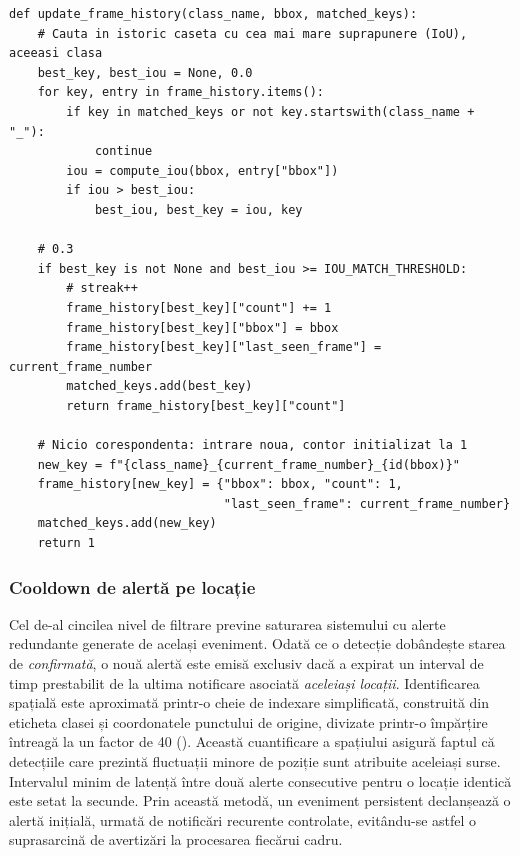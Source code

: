 \documentclass[../../main.tex]{subfiles}
\begin{document}
\begin{listing}[H]
\begin{verbatim}
def update_frame_history(class_name, bbox, matched_keys):
    # Cauta in istoric caseta cu cea mai mare suprapunere (IoU), aceeasi clasa
    best_key, best_iou = None, 0.0
    for key, entry in frame_history.items():
        if key in matched_keys or not key.startswith(class_name + "_"):
            continue
        iou = compute_iou(bbox, entry["bbox"])
        if iou > best_iou:
            best_iou, best_key = iou, key

    # 0.3
    if best_key is not None and best_iou >= IOU_MATCH_THRESHOLD:
        # streak++
        frame_history[best_key]["count"] += 1
        frame_history[best_key]["bbox"] = bbox
        frame_history[best_key]["last_seen_frame"] = current_frame_number
        matched_keys.add(best_key)
        return frame_history[best_key]["count"]

    # Nicio corespondenta: intrare noua, contor initializat la 1
    new_key = f"{class_name}_{current_frame_number}_{id(bbox)}"
    frame_history[new_key] = {"bbox": bbox, "count": 1,
                              "last_seen_frame": current_frame_number}
    matched_keys.add(new_key)
    return 1
\end{verbatim}
\caption{Corelarea temporală a detecțiilor prin IoU (\texttt{\_update\_frame\_history} din \texttt{fire\_detection\_system.py}).}
\label{lst:fire_history}
\end{listing}

\subsubsection{Cooldown de alertă pe locație}
\label{subsubsec:cooldown}

Cel de-al cincilea nivel de filtrare previne saturarea sistemului cu alerte redundante generate de același eveniment. Odată ce o detecție dobândește starea de \textit{confirmată}, o nouă alertă este emisă exclusiv dacă a expirat un interval de timp prestabilit de la ultima notificare asociată \textit{aceleiași locații}. Identificarea spațială este aproximată printr-o cheie de indexare simplificată, construită din eticheta clasei și coordonatele punctului de origine, divizate printr-o împărțire întreagă la un factor de 40 (). Această cuantificare a spațiului asigură faptul că detecțiile care prezintă fluctuații minore de poziție sunt atribuite aceleiași surse. Intervalul minim de latență între două alerte consecutive pentru o locație identică este setat la  secunde. Prin această metodă, un eveniment persistent declanșează o alertă inițială, urmată de notificări recurente controlate, evitându-se astfel o suprasarcină de avertizări la procesarea fiecărui cadru.
\end{document}
